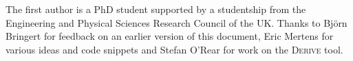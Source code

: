 \documentclass[preprint]{sigplanconf}
\begin{document}
\begin{comment}
<p>
    Many of the examples from the original SYB paper are recapped in the Compos paper, so have been covered in the next section. This section focuses on the underlying traversal mechanism employed by both types.
</p>
<p style="text-align:center;">
    <img src="img/syb_vs_play.png" alt="SYB vs Play, notion of children" />
</p>
<p>
    Both traversals are based on the idea of finding the immediate children of a node. The difference is that Play considers a child to be one of the same type, which may not be immediately below the node. In contrast SYB considers all the immediate children. The above diagram shows the difference, where the orange nodes are all of the same type, and those with a black border are considered children.
</p>
<p>
    While the SYB approach is clearly more logical in an untyped language, in a typed language it requires a considerable amount of trickery to get the types correct. The primary SYB traversal function is:
</p>
<pre>
gfoldl :: (forall a b. Term a => w (a -> b)
                              -> a -> w b)
       -> (forall g. g -> w g)
       -> a -> w a
</pre>
<p>
    In the original SYB paper the authors note "Trying to understand the type of <tt>gfoldl</tt> directly can lead to brain damage." When compared to the type of <tt>replaceChildren</tt>, it is easy to see which is simpler at the type level.
</p>
<pre>
replaceChildren :: on -> ([on], [on] -> on)
</pre>
<p>
    The basic difference between SYB and Play is the choice of the notion of children. It is reasonably easy to see that SYB is more powerful - there are many nodes in the above example that Play cannot reach. However in a typed language this has come at the cost of substantial type based thought. Play on the other hand simplified things with its alternative definition of child.
</p>





%
\end{comment}
\acks

The first author is a PhD student supported by a studentship from the Engineering and Physical Sciences Research Council of the UK. Thanks to Bj\"{o}rn Bringert for feedback on an earlier version of this document, Eric Mertens for various ideas and code snippets and Stefan O'Rear for work on the \textsc{Derive} tool.



\end{document}
